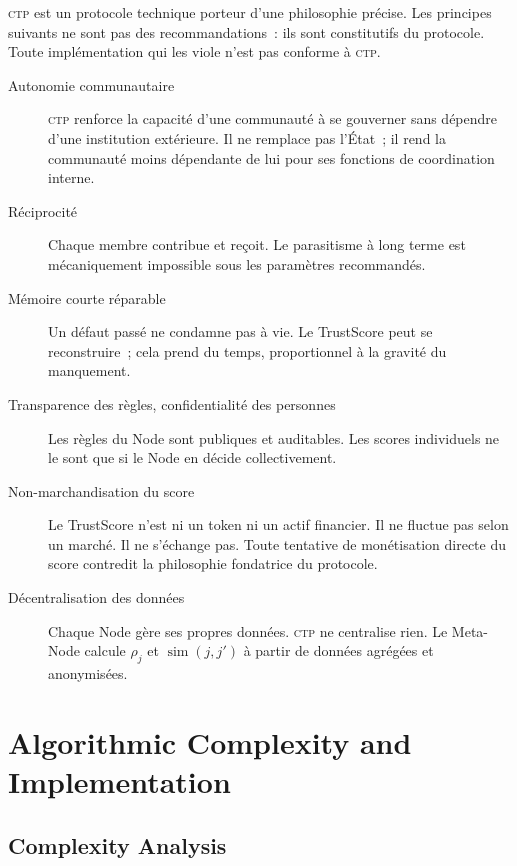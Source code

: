 \documentclass[12pt,a4paper]{article}
\theoremstyle{definition}
\theoremstyle{plain}
\theoremstyle{remark}
\newcommand{\CTP}{\textsc{ctp}}
\newcommand{\1}{\mathbf{1}}
\begin{document}
\CTP{} est un protocole technique porteur d'une philosophie précise. Les
principes suivants ne sont pas des recommandations~: ils sont constitutifs du
protocole. Toute implémentation qui les viole n'est pas conforme à \CTP{}.

\begin{description}
  \item[Autonomie communautaire] \CTP{} renforce la capacité d'une communauté
    à se gouverner sans dépendre d'une institution extérieure. Il ne remplace
    pas l'État~; il rend la communauté moins dépendante de lui pour ses
    fonctions de coordination interne.

  \item[Réciprocité] Chaque membre contribue et reçoit. Le parasitisme à long
    terme est mécaniquement impossible sous les paramètres recommandés.

  \item[Mémoire courte réparable] Un défaut passé ne condamne pas à vie.
    Le TrustScore peut se reconstruire~; cela prend du temps, proportionnel à
    la gravité du manquement.

  \item[Transparence des règles, confidentialité des personnes] Les règles du
    Node sont publiques et auditables. Les scores individuels ne le sont que
    si le Node en décide collectivement.

  \item[Non-marchandisation du score] Le TrustScore n'est ni un token ni un
    actif financier. Il ne fluctue pas selon un marché. Il ne s'échange pas.
    Toute tentative de monétisation directe du score contredit la philosophie
    fondatrice du protocole.

  \item[Décentralisation des données] Chaque Node gère ses propres données.
    \CTP{} ne centralise rien. Le Meta-Node calcule $\rho_j$ et
    $\operatorname{sim}(j,j')$ à partir de données agrégées et anonymisées.
\end{description}

\section{Algorithmic Complexity and Implementation}
\label{sec:complexity}

\subsection{Complexity Analysis}
\end{document}

